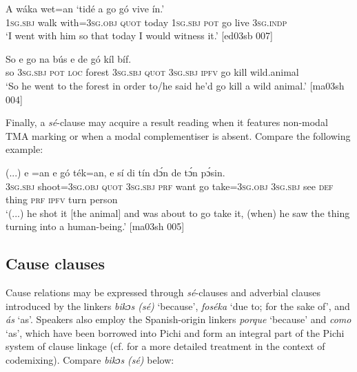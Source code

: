 \ea%
    \label{ex:key:1501}
    \gll A    wáka  wet=an        ‘tidé    a    go  gó  vive    ín.’\\
\textsc{1sg.sbj}  walk  with=\textsc{3sg.obj}  \textsc{quot}    today  \textsc{1sg.sbj}  \textsc{pot}  go  live    \textsc{3sg.indp}\\

\glt ‘I went with him so that today I would witness it.’ [ed03sb 007]
\z


\ea%
    \label{ex:key:1502}
    \gll So  e    go  na  bús            e    de  gó  kíl  bíf.\\
so  \textsc{3sg.sbj}  \textsc{pot}  \textsc{loc}  forest  \textsc{3sg.sbj}  \textsc{quot}    \textsc{3sg.sbj}  \textsc{ipfv}  go  kill  wild.animal\\

\glt ‘So he went to the forest in order to/he said he’d go kill a wild animal.’ [ma03sh 004]
\z

Finally, a \textit{sé}{}-clause may acquire a result reading when it features non-modal TMA marking or when a modal complementiser is absent. Compare the following example:


\ea%
    \label{ex:key:1503}
    \gll (...)  e    =an        e        gó  ték=an,
{} e    sí  di  tín    dɔ́n  de  tɔ́n    pɔ́sin.\\
  \textsc{3sg.sbj}  shoot=\textsc{3sg.obj}  \textsc{quot}    \textsc{3sg.sbj}  \textsc{prf}  want  go  take=\textsc{3sg.obj}
\textsc{3sg.sbj}  see  \textsc{def}  thing  \textsc{prf}  \textsc{ipfv}  turn    person\\

\glt ‘(...) he shot it [the animal] and was about to go take it, (when) he saw the thing 
turning into a human-being.’ [ma03sh 005]
\z

\subsection{Cause clauses}\label{sec:10.7.7}

Cause relations may be expressed through \textit{sé}{}-clauses and adverbial clauses introduced by the linkers \textit{bikɔs (sé)} ‘because’, \textit{foséka} ‘due to; for the sake of’, and \textit{ás} ‘as’. Speakers also employ the Spanish-origin linkers \textit{porque} ‘because’ and \textit{como} ‘as’, which have been borrowed into Pichi and form an integral part of the Pichi system of clause linkage (cf.  for a more detailed treatment in the context of codemixing). Compare \textit{bikɔs} \textit{(sé)} below:


